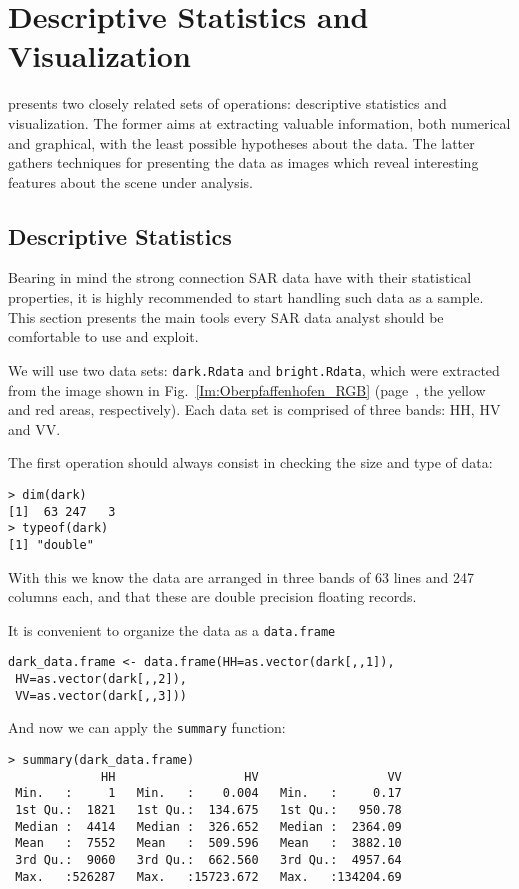 \chapter{Descriptive Statistics and Visualization}\label{Chapter:DescriptiveVisualization}

 presents two closely related sets of operations:
descriptive statistics and visualization.
The former aims at extracting valuable information, both numerical and graphical, with the least possible hypotheses about the data.
The latter gathers techniques for presenting the data as images which reveal interesting features about the scene under analysis.

\section{Descriptive Statistics}

Bearing in mind the strong connection SAR data have with their statistical properties, it is highly recommended to start handling such data as a sample. This section presents the main tools every SAR data analyst should be comfortable to use and exploit.

We will use two data sets: \texttt{dark.Rdata} and \texttt{bright.Rdata}, which were extracted from the image shown in Fig.~\ref{Im:Oberpfaffenhofen_RGB} (page~\pageref{Im:Oberpfaffenhofen_RGB}, the yellow and red areas, respectively).
Each data set is comprised of three bands: HH, HV and VV.

The first operation should always consist in checking the size and type of data:
\begin{lstlisting}[frame=tb]
> dim(dark)
[1]  63 247   3
> typeof(dark)
[1] "double"
\end{lstlisting}
With this we know the data are arranged in three bands of \num{63} lines and \num{247} columns each, and that these are double precision floating records.

It is convenient to organize the data as a \texttt{data.frame}
\begin{lstlisting}[frame=tb]
dark_data.frame <- data.frame(HH=as.vector(dark[,,1]),
 HV=as.vector(dark[,,2]), 
 VV=as.vector(dark[,,3]))
\end{lstlisting}

And now we can apply the \texttt{summary} function:
\begin{lstlisting}[caption={Summary statistics,frame=tb},label=Code:SummaryStatistics]
> summary(dark_data.frame)
             HH                  HV                  VV
 Min.   :     1   Min.   :    0.004   Min.   :     0.17  
 1st Qu.:  1821   1st Qu.:  134.675   1st Qu.:   950.78  
 Median :  4414   Median :  326.652   Median :  2364.09  
 Mean   :  7552   Mean   :  509.596   Mean   :  3882.10  
 3rd Qu.:  9060   3rd Qu.:  662.560   3rd Qu.:  4957.64  
 Max.   :526287   Max.   :15723.672   Max.   :134204.69  
\end{lstlisting}

